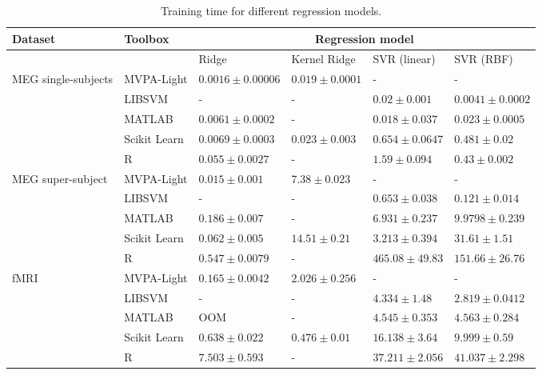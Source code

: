 \documentclass[utf8]{frontiersSCNS} %
\begin{document}
\begin{table}
\footnotesize
\begin{tabular}{ |p{1.1cm}|p{1.8cm}|p{2cm}|p{2cm}|p{2cm}|p{2cm}|}
 \hline
 Dataset & Toolbox  & \multicolumn{4}{c|}{Regression model}\\ \hline
\multicolumn{2}{|c|}{}  & Ridge & Kernel Ridge & SVR (linear) & SVR (RBF)\\
 \hline
\multirow{4}{1.3cm}{MEG single-subjects} & MVPA-Light  & $\mathbf{0.0016}\pm0.00006$ & $\mathbf{0.019}\pm0.0001$ & - & -\\
\cline{2-6}
  & LIBSVM & - &  - & $0.02\pm0.001$ & $\mathbf{0.0041}\pm0.0002$ \\
\cline{2-6}
  & MATLAB & $0.0061\pm0.0002$ & - & $\mathbf{0.018}\pm0.037$ & $0.023\pm0.0005$\\   %
\cline{2-6}
  & Scikit Learn & $0.0069\pm0.0003$ & $0.023\pm0.003$ & $0.654\pm0.0647$ & $0.481\pm0.02$\\
\cline{2-6}
  & R & $0.055\pm0.0027$ & - & $1.59\pm0.094$ & $0.43\pm0.002$ \\\hline
 \hline
 \multirow{4}{1.3cm}{MEG super-subject} & MVPA-Light & $\mathbf{0.015}\pm0.001$ & $\mathbf{7.38}\pm0.023$ & - & -\\
\cline{2-6}
  & LIBSVM & - &  - & $\mathbf{0.653}\pm0.038$ & $\mathbf{0.121}\pm0.014$ \\
\cline{2-6}
  & MATLAB & $0.186\pm0.007$ & - & $6.931\pm0.237$ & $9.9798\pm0.239$\\
\cline{2-6}
  & Scikit Learn & $0.062\pm0.005$ & $14.51\pm0.21$ & $3.213\pm0.394$ & $31.61\pm1.51$\\
\cline{2-6}
  & R & $0.547\pm0.0079$ & - & $465.08\pm49.83$ & $151.66\pm26.76$\\\hline
  \hline
\multirow{4}{1.3cm}{fMRI} & MVPA-Light & $\mathbf{0.165}\pm0.0042$ & $2.026\pm0.256$ & - & -\\
\cline{2-6}
  & LIBSVM & - &  - & $\mathbf{4.334}\pm1.48$ & $\mathbf{2.819}\pm0.0412$ \\
\cline{2-6}
  & MATLAB & OOM & - & $4.545\pm0.353$  & $4.563\pm0.284$\\
\cline{2-6}
  & Scikit Learn & $0.638\pm0.022$ & $\mathbf{0.476}\pm0.01$ & $16.138\pm3.64$ & $9.999\pm0.59$\\
\cline{2-6}
  & R & $7.503\pm0.593$ & - & $37.211\pm2.056$ & $41.037\pm2.298$\\\hline
\end{tabular}
\caption{Training time for different regression models.}
\label{tab:regression}
\end{table}
\end{document}
